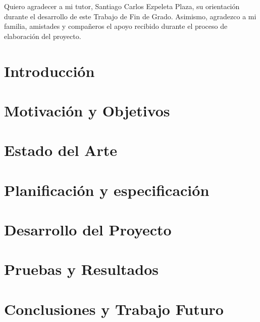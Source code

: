 \documentclass[twoside,spanish,a4paper,12pt]{tfg}
\begin{document}
\begin{agradecimientos}
Quiero agradecer a mi tutor, Santiago Carlos Ezpeleta Plaza, su orientación durante el desarrollo de este Trabajo de Fin de Grado. Asimismo, agradezco a mi familia, amistades y compañeros el apoyo recibido durante el proceso de elaboración del proyecto.
\end{agradecimientos}
\cleardoublepage

\tableofcontents

\pagestyle{tfg}
\justify




\chapter{Introducción}


\chapter{Motivación y Objetivos}


\chapter{Estado del Arte}


\chapter{Planificación y especificación}


\chapter{Desarrollo del Proyecto}


\chapter{Pruebas y Resultados}


\chapter{Conclusiones y Trabajo Futuro}



\appendix
\pagestyle{appendix}




\end{document}
